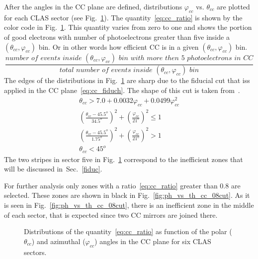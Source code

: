 After the angles in the CC plane are defined, distributions $\varphi_{cc}$ vs. $\theta_{cc}$ are plotted for each CLAS sector (see Fig.~\ref{fig:ph_vs_th_cc}).
The quantity~\ref{eq:cc_ratio} is shown by the color code in Fig.~\ref{fig:ph_vs_th_cc}. This quantity varies from zero to one and shows the portion of good electrons with number of photoelectrons greater than five inside a $(\theta_{cc},\varphi_{cc})$ bin. Or in other words how efficient CC is in a given $(\theta_{cc},\varphi_{cc})$ bin. 
\begin{equation}
\frac{number\,\, of\,\, events\,\,  inside\,\, (\theta_{cc},\varphi_{cc})\,\, bin\,\, with\,\, more\,\, then\,\, 5\,\, photoelectrons\,\, in\,\, CC}{total\,\, number\,\, of\,\, events\,\,  inside\,\, (\theta_{cc},\varphi_{cc})\,\, bin}
\label{eq:cc_ratio}
\end{equation}
The edges of the distributions in Fig.~\ref{fig:ph_vs_th_cc} are sharp due to the fiducial cut that iss applied in the CC plane~\ref{eq:cc_fiduch}. 
The shape of this cut  is taken from~\cite{Khetarpal:2010}.
\begin{equation}
\begin{aligned}
\theta_{cc} > 7.0+0.0032\varphi_{cc}+0.0499\varphi_{cc}^{2} \\
\left( \frac{\theta_{cc}-45.5^{o}}{34.5^{o}} \right)^{2} + \left( \frac{\varphi_{cc}}{21^{o}} \right)^{2} \le 1 \\
\left( \frac{\theta_{cc}-45.5^{o}}{1.75^{o}} \right)^{2} + \left( \frac{\varphi_{cc}}{21^{o}} \right)^{2} > 1 \\
\theta_{cc} < 45^{o} \, \, \,  \, \, \, \, \, \,   \, \, \,  \, \, \, \, \, \,
\label{eq:cc_fiduch}
\end{aligned}
\end{equation}
The two stripes in sector five in Fig.~\ref{fig:ph_vs_th_cc} correspond to the inefficient zones that will be discussed in~Sec.~\ref{fiduc}.

For further analysis only zones with a ratio~\ref{eq:cc_ratio} greater than $0.8$ are selected. These zones are shown in black in Fig.~\ref{fig:ph_vs_th_cc_08cut}. As it is seen in Fig.~\ref{fig:ph_vs_th_cc_08cut}, there is an inefficient zone in the middle of each sector, that is expected since two CC mirrors are joined there.

\begin{figure}[htp]
\begin{center}
\caption{\small  Distributions of the quantity~\ref{eq:cc_ratio} as function of the polar ($\theta_{cc}$) and azimuthal ($\varphi_{cc}$) angles in the CC plane for six CLAS sectors.} \label{fig:ph_vs_th_cc}
\end{center}
\end{figure}

